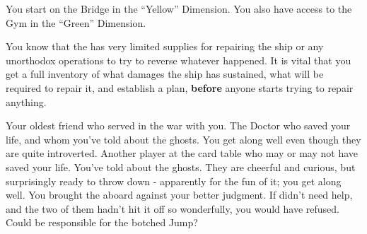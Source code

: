 \documentclass[char]{TMFHope}
\begin{document}
\begin{itemz}[Notes]
	\item You start on the Bridge in the ``Yellow'' Dimension. You also have access to the Gym in the ``Green'' Dimension. 
	\item You know that the \pNew{} has very limited supplies for repairing the ship or any unorthodox operations to try to reverse whatever happened. It is vital that you get a full inventory of what damages the ship has sustained, what will be required to repair it, and establish a plan, {\bf before} anyone starts trying to repair anything.
\end{itemz}

\begin{contacts}
	\contact{\cXO{}} Your oldest friend who served in the war with you.
	\contact{\cMed{}} The Doctor who saved your life, and whom you've told about the ghosts. You get along well even though they are quite introverted.
	\contact{\cSci{}} Another player at the card table who may or may not have saved your life. You've told \cSci{\them} about the ghosts. They are cheerful and curious, but surprisingly ready to throw down - apparently for the fun of it; you get along well.
	\contact{\cBoy{}} You brought the \cBoy{\kid} aboard against your better judgment. If \cEng{} didn't need help, and the two of them hadn't hit it off so wonderfully, you would have refused. Could \cBoy{} be responsible for the botched Jump?
\end{contacts}
\end{document}

